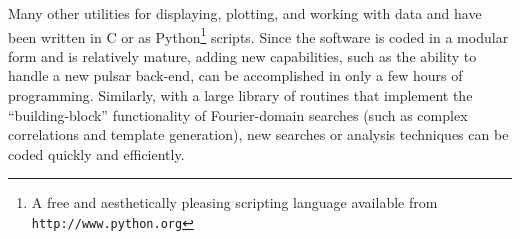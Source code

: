 \documentclass[11pt]{article}
\begin{document}
Many other utilities for displaying, plotting, and working with data
and have been written in C or as Python\footnote{A free and
  aesthetically pleasing scripting language available from {\tt
    http://www.python.org}} scripts.  Since the software is coded in a
modular form and is relatively mature, adding new capabilities, such
as the ability to handle a new pulsar back-end, can be accomplished in
only a few hours of programming.  Similarly, with a large library of
routines that implement the ``building-block'' functionality of
Fourier-domain searches (such as complex correlations and template
generation), new searches or analysis techniques can be coded quickly
and efficiently.
\end{document}
